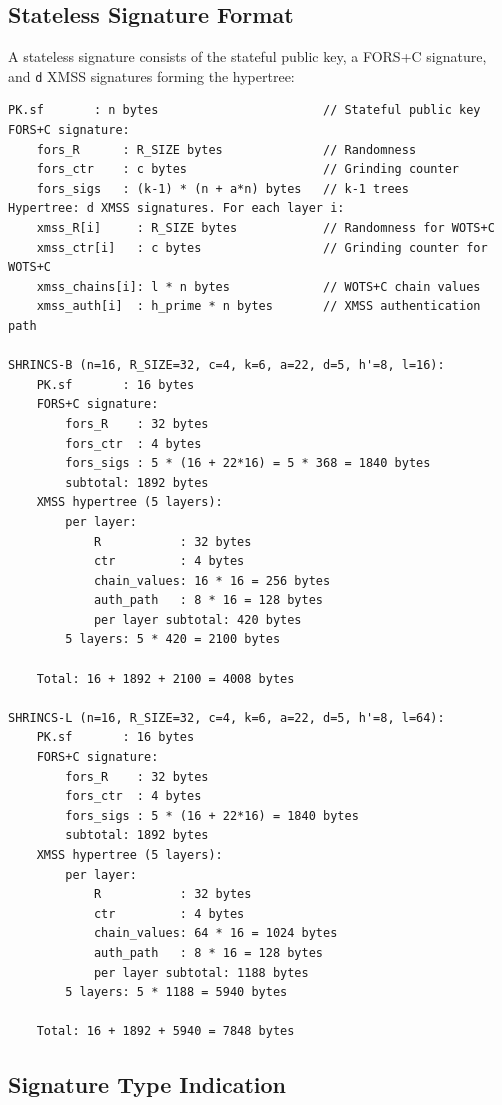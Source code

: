 \subsection{Stateless Signature Format}
A stateless signature consists of the stateful public key, a FORS+C signature, and \texttt{d} XMSS signatures forming the hypertree:
\begin{verbatim}
PK.sf       : n bytes                       // Stateful public key 
FORS+C signature:
    fors_R      : R_SIZE bytes              // Randomness
    fors_ctr    : c bytes                   // Grinding counter  
    fors_sigs   : (k-1) * (n + a*n) bytes   // k-1 trees
Hypertree: d XMSS signatures. For each layer i:
    xmss_R[i]     : R_SIZE bytes            // Randomness for WOTS+C
    xmss_ctr[i]   : c bytes                 // Grinding counter for WOTS+C
    xmss_chains[i]: l * n bytes             // WOTS+C chain values
    xmss_auth[i]  : h_prime * n bytes       // XMSS authentication path

SHRINCS-B (n=16, R_SIZE=32, c=4, k=6, a=22, d=5, h'=8, l=16):
    PK.sf       : 16 bytes
    FORS+C signature:
        fors_R    : 32 bytes
        fors_ctr  : 4 bytes
        fors_sigs : 5 * (16 + 22*16) = 5 * 368 = 1840 bytes
        subtotal: 1892 bytes
    XMSS hypertree (5 layers):
        per layer:
            R           : 32 bytes
            ctr         : 4 bytes  
            chain_values: 16 * 16 = 256 bytes
            auth_path   : 8 * 16 = 128 bytes
            per layer subtotal: 420 bytes
        5 layers: 5 * 420 = 2100 bytes
  
    Total: 16 + 1892 + 2100 = 4008 bytes

SHRINCS-L (n=16, R_SIZE=32, c=4, k=6, a=22, d=5, h'=8, l=64):
    PK.sf       : 16 bytes
    FORS+C signature:
        fors_R    : 32 bytes
        fors_ctr  : 4 bytes
        fors_sigs : 5 * (16 + 22*16) = 1840 bytes
        subtotal: 1892 bytes
    XMSS hypertree (5 layers):
        per layer:
            R           : 32 bytes
            ctr         : 4 bytes
            chain_values: 64 * 16 = 1024 bytes  
            auth_path   : 8 * 16 = 128 bytes
            per layer subtotal: 1188 bytes
        5 layers: 5 * 1188 = 5940 bytes
  
    Total: 16 + 1892 + 5940 = 7848 bytes
\end{verbatim}

\subsection{Signature Type Indication}

